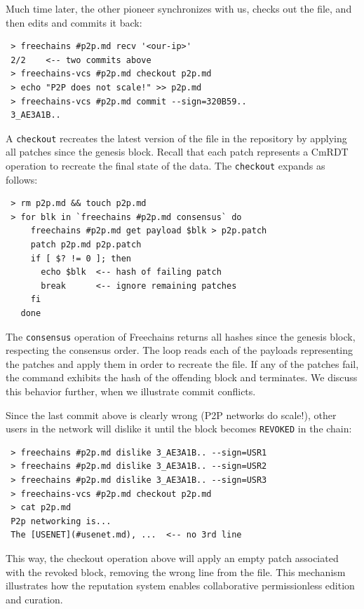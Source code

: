 \documentclass[10pt,journal,compsoc]{IEEEtran}
\newcommand{\FC}       {Freechains\xspace}
\newcommand{\code}[1]  {\texttt{\footnotesize{#1}}}
\begin{document}
Much time later, the other pioneer synchronizes with us, checks out the file,
and then edits and commits it back:

{\footnotesize
\begin{verbatim}
 > freechains #p2p.md recv '<our-ip>'
 2/2    <-- two commits above
 > freechains-vcs #p2p.md checkout p2p.md
 > echo "P2P does not scale!" >> p2p.md
 > freechains-vcs #p2p.md commit --sign=320B59..
 3_AE3A1B..
\end{verbatim}
}

A \code{checkout} recreates the latest version of the file in the repository by
applying all patches since the genesis block.
Recall that each patch represents a CmRDT operation to recreate the final state
of the data.
The \code{checkout} expands as follows:

{\footnotesize
\begin{verbatim}
 > rm p2p.md && touch p2p.md
 > for blk in `freechains #p2p.md consensus` do
     freechains #p2p.md get payload $blk > p2p.patch
     patch p2p.md p2p.patch
     if [ $? != 0 ]; then
       echo $blk  <-- hash of failing patch
       break      <-- ignore remaining patches
     fi
   done
\end{verbatim}
}

The \code{consensus} operation of \FC returns all hashes since
the genesis block, respecting the consensus order.
The loop reads each of the payloads representing the patches and apply them in
order to recreate the file.
If any of the patches fail, the command exhibits the hash of the offending
block and terminates.
We discuss this behavior further, when we illustrate commit conflicts.

Since the last commit above is clearly wrong (P2P networks do scale!), other
users in the network will dislike it until the block becomes
\code{REVOKED} in the chain: %

{\footnotesize
\begin{verbatim}
 > freechains #p2p.md dislike 3_AE3A1B.. --sign=USR1
 > freechains #p2p.md dislike 3_AE3A1B.. --sign=USR2
 > freechains #p2p.md dislike 3_AE3A1B.. --sign=USR3
 > freechains-vcs #p2p.md checkout p2p.md
 > cat p2p.md
 P2p networking is...
 The [USENET](#usenet.md), ...  <-- no 3rd line
\end{verbatim}
}

This way, the checkout operation above will apply an empty patch associated
with the revoked block, removing the wrong line from the file.
This mechanism illustrates how the reputation system enables collaborative
permissionless edition and curation.
\end{document}
